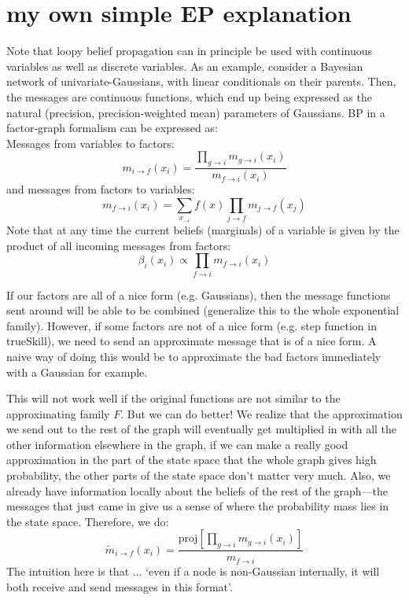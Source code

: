 \documentclass[11pt]{article}
\begin{document}
\section{my own simple EP explanation}
Note that loopy belief propagation can in principle be used with continuous variables as well as discrete variables. As an example, consider a Bayesian network of univariate-Gaussians, with linear conditionals on their parents. Then, the messages are continuous functions, which end up being expressed as the natural (precision, precision-weighted mean) parameters of Gaussians. BP in a factor-graph formalism can be expressed as:\\
Messages from variables to factors:
\[ m_{i \to f}(x_i) = \frac{\prod_{g \to i} m_{g \to i}(x_i)}{m_{f \to i}(x_i)} \]
and messages from factors to variables:
\[ m_{f \to i}(x_i) = \sum_{x_{-i}} f(x) \prod_{j \to f} m_{j \to f}(x_j)\]
Note that at any time the current beliefs (marginals) of a variable is given by the product of all incoming messages from factors:
\[ \beta_i(x_i) \propto \prod_{f \to i} m_{f \to i}(x_i)\]

If our factors are all of a nice form (e.g. Gaussians), then the message functions sent around will be able to be combined (generalize this to the whole exponential family). However, if some factors are not of a nice form (e.g. step function in trueSkill), we need to send an approximate message that is of a nice form. A naive way of doing this would be to approximate the bad factors immediately with a Gaussian for example.

This will not work well if the original functions are not similar to the approximating family $F$. But we can do better! We realize that the approximation we send out to the rest of the graph will eventually get multiplied in with all the other information elsewhere in the graph, if we can make a really good approximation in the part of the state space that the whole graph gives high probability, the other parts of the state space don't matter very much. Also, we already have information locally about the beliefs of the rest of the graph---the messages that just came in give us a sense of where the probability mass lies in the state space. Therefore, we do:
\[ \tilde{m}_{i \to f}(x_i) = \frac{\mbox{proj}[\prod_{g \to i} m_{g \to i}(x_i)]}{m_{f \to i}}\]
The intuition here is that ... `even if a node is non-Gaussian internally, it will both receive and send messages in this format'.
\end{document}
